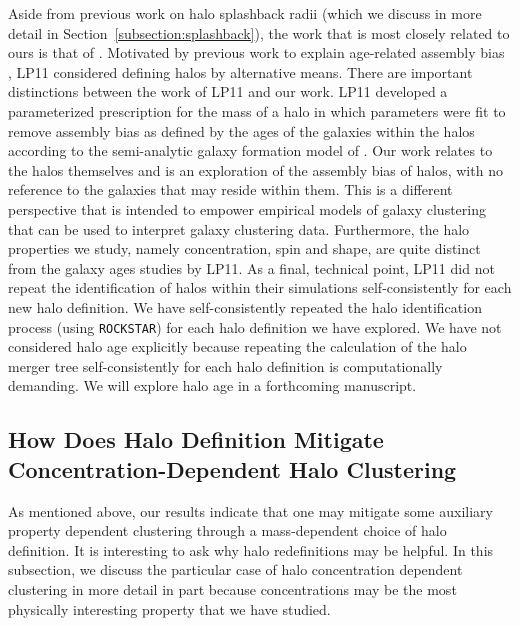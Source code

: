 \documentclass[usenatbib,fleqn]{mnras}
\begin{document}
Aside from previous work on halo splashback radii (which we discuss in more detail in Section~\ref{subsection:splashback}), the work that is most closely related to ours is that of \citet[][hereafter LP11]{lacerna_padilla11}. Motivated by previous work to explain age-related assembly bias \citep{wang_etal07,wang_etal08,warnick_etal08,dalal_etal08,hahn_etal09}, LP11 considered defining halos by alternative means. There are important distinctions between the work of LP11 and our work. LP11 developed a parameterized prescription for the mass of a halo in which parameters were fit to remove assembly bias as defined by the ages of the galaxies within the halos according to the semi-analytic galaxy formation model of \citet{lagos_etal08}. Our work relates to the halos themselves and is an exploration of the assembly bias of halos, with no reference to the galaxies that may reside within them. This is a different perspective that is intended to empower empirical models of galaxy clustering that can be used to interpret galaxy clustering data. Furthermore, the halo properties we study, namely concentration, spin and shape, are quite distinct from the galaxy ages studies by LP11. As a final, technical point, LP11 did not repeat the identification of halos within their simulations self-consistently for each new halo definition. We have self-consistently repeated the halo identification process (using {\tt ROCKSTAR}) for each halo definition we have explored. We have not considered halo age explicitly because repeating the calculation of the halo merger tree self-consistently for each halo definition is computationally demanding. We will explore halo age in a forthcoming manuscript.

\subsection{How Does Halo Definition Mitigate Concentration-Dependent Halo Clustering}

As mentioned above, our results indicate that one may mitigate some auxiliary property dependent clustering through a mass-dependent choice of halo definition. It is interesting to ask why halo redefinitions may be helpful. In this subsection, we discuss the particular case of halo concentration dependent clustering in more detail in part because concentrations may be the most physically interesting property that we have studied.
\end{document}
